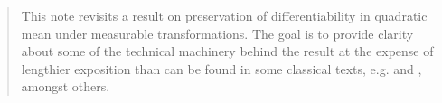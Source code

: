 
\begin{abstract}
This note revisits a result on preservation of differentiability in quadratic
mean under measurable transformations.
The goal is to provide clarity about some of the technical machinery behind the
result at the expense of lengthier exposition than can be found in some
classical texts, e.g.
\citet[Theorem 7.2, p. 70]{1981ibragimovStatisticalEstimation} and
\citet[Proposition A.5.5, p. 461]{1998bickelEfficientAdaptiveEstimation},
amongst others.
\end{abstract}

